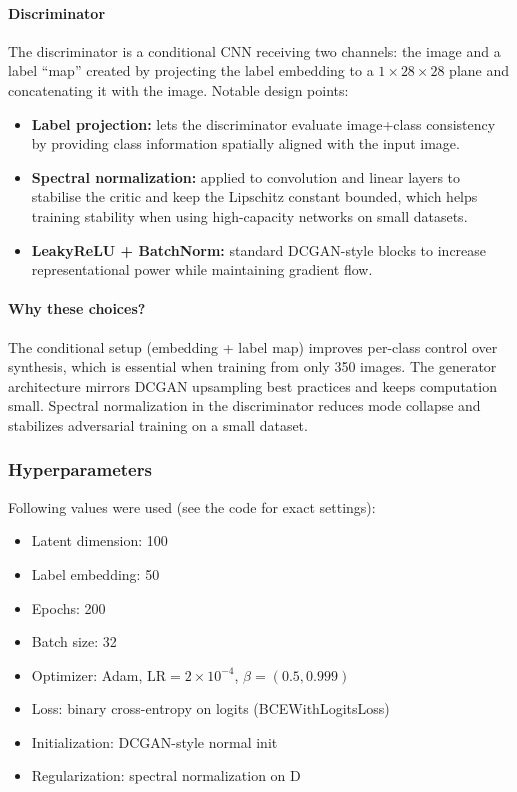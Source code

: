 \paragraph{Discriminator}
The discriminator is a conditional CNN receiving two channels: the image and a label ``map'' created by projecting the label embedding to a $1\times28\times28$ plane and concatenating it with the image. Notable design points:
\begin{itemize}
	\item \textbf{Label projection:} lets the discriminator evaluate image+class consistency by providing class information spatially aligned with the input image.
	\item \textbf{Spectral normalization:} applied to convolution and linear layers to stabilise the critic and keep the Lipschitz constant bounded, which helps training stability when using high-capacity networks on small datasets.
	\item \textbf{LeakyReLU + BatchNorm:} standard DCGAN-style blocks to increase representational power while maintaining gradient flow.
\end{itemize}

\paragraph{Why these choices?}
The conditional setup (embedding + label map) improves per-class control over synthesis, which is essential when training from only 350 images. The generator architecture mirrors DCGAN upsampling best practices and keeps computation small. Spectral normalization in the discriminator reduces mode collapse and stabilizes adversarial training on a small dataset.

\subsubsection*{Hyperparameters}
Following values were used (see the code for exact settings):
\begin{itemize}
	\item Latent dimension: 100
	\item Label embedding: 50
	\item Epochs: 200
	\item Batch size: 32
	\item Optimizer: Adam, $\mathrm{LR}=2\times10^{-4}$, $\beta=(0.5,0.999)$
	\item Loss: binary cross-entropy on logits (BCEWithLogitsLoss)
	\item Initialization: DCGAN-style normal init
	\item Regularization: spectral normalization on D
\end{itemize}

